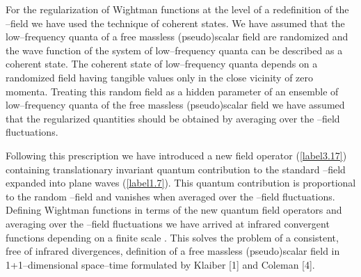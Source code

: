 \documentclass[a4paper,12pt] {article}
\begin{document}
For the regularization of Wightman functions at the level of a
redefinition of the \myHighlight{$\vartheta$}\coordHE{}--field we have used the technique of
coherent states. We have assumed that the low--frequency quanta of a
free massless (pseudo)scalar field are randomized and the wave
function of the system of low--frequency quanta can be described as a
coherent state. The coherent state of low--frequency quanta depends on
a randomized field \coordHE{} having tangible values only in the
close vicinity of zero momenta.  Treating this random field as a
hidden parameter of an ensemble of low--frequency quanta of the free
massless (pseudo)scalar field \coordHE{} we have assumed that the
regularized quantities should be obtained by averaging over the
\myHighlight{$\eta$}\coordHE{}--field fluctuations.

Following this prescription we have introduced a new field operator
\coordHE{} (\ref{label3.17}) containing translationary
invariant quantum contribution to the standard \myHighlight{$\vartheta$}\coordHE{}--field
expanded into plane waves (\ref{label1.7}). This quantum contribution
is proportional to the random \myHighlight{$\eta$}\coordHE{}--field and vanishes when averaged
over the \myHighlight{$\eta$}\coordHE{}--field fluctuations. Defining Wightman functions in
terms of the new quantum field operators \coordHE{} and
averaging over the \myHighlight{$\eta$}\coordHE{}--field fluctuations we have arrived at
infrared convergent functions \coordHE{} depending on a finite
scale \coordHE{}. This solves the problem of a consistent, free of infrared
divergences, definition of a free massless (pseudo)scalar field in
1+1--dimensional space--time formulated by Klaiber [1] and Coleman
[4].
\end{document}
